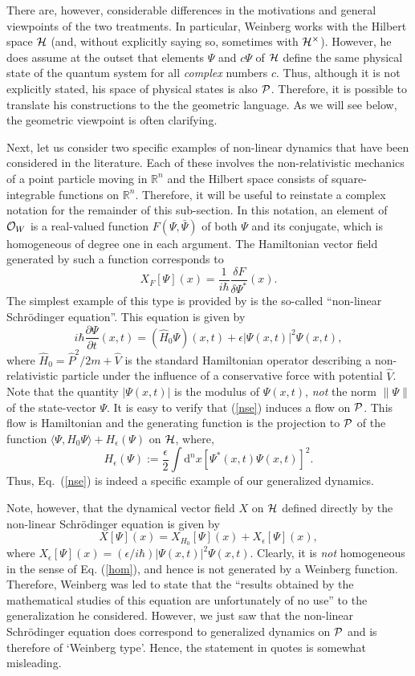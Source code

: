 \documentclass[12pt,aps,eqsecnum,tighten]{revtex4-2}
\def\be{\begin{equation}}
\def\ee{\end{equation}}
\def\<{\langle}
\def\>{\rangle}
\def\d{{\mathrm d}}
\def\i{{i}}
\def\H{{\cal H}}
\def\punctH{{\cal H}^{\times}}
\def\P{{\cal P}}
\newcommand{\hvf}[1]{{X_{#1}}}
\def\R{\mathbb R}
\begin{document}
There are, however, considerable differences in the motivations and
general viewpoints of the two treatments. In particular, Weinberg
works with the Hilbert space $\H$ (and, without explicitly saying so,
sometimes with $\punctH$). However, he does assume at the outset that
elements $\Psi$ and $c\Psi$ of $\H$ define the same physical state of
the quantum system for all {\it complex} numbers $c$. Thus, although
it is not explicitly stated, his space of physical states is also
$\P$.  Therefore, it is possible to translate his constructions to the
the geometric language. As we will see below, the geometric viewpoint
is often clarifying.

Next, let us consider two specific examples of non-linear dynamics
that have been considered in the literature.  Each of these involves
the non-relativistic mechanics of a point particle moving in $\R^n$
and the Hilbert space consists of square-integrable functions on
$\R^n$. Therefore, it will be useful to reinstate a complex notation
for the remainder of this sub-section.  In this notation, an element
of ${\cal O}_W$ is a real-valued function $F(\Psi, \bar{\Psi})$ of
both $\Psi$ and its conjugate, which is homogeneous of degree one in
each argument. The Hamiltonian vector field generated by such a
function corresponds to
%
\be 
\hvf{F}[\Psi](x) = \frac{1}{\i\hbar} \frac{\delta
F}{\delta \Psi^*} ( x ).  
\ee
%
The simplest example of this type is provided by is the so-called
``non-linear Schr\"odinger equation''.  This equation is given by
%
\be \label{nse}
\i\hbar \frac{\partial \Psi}{\partial t}(x,t) = 
(\hat{H}_0 \Psi)(x,t) + \epsilon | \Psi(x,t) |^2 \Psi(x,t),
\ee
%
where $\hat{H}_0 = \hat{P}^2/2m + \hat{V}$ is the standard Hamiltonian
operator describing a non-relativistic particle under the influence of
a conservative force with potential $\hat{V}$.  Note that the quantity
$| \Psi(x,t) | $ is the modulus of $\Psi(x,t)$, {\em not} the norm
$\|\Psi\|$ of the state-vector $\Psi$. It is easy to verify that
(\ref{nse}) induces a flow on $\P$. This flow is Hamiltonian and the
generating function is the projection to $\P$ of the function
$\<\Psi, H_0\Psi\> + H_\epsilon(\Psi)$ on $\H$, where,
%
\be
 H_\epsilon(\Psi) := \frac{\epsilon}{2}\int \d^n \! x
\left[ \Psi^*(x,t) \Psi(x,t) \right]^2.
\ee
%
Thus, Eq.~(\ref{nse}) is indeed a specific example of our generalized
dynamics.

Note, however, that the dynamical vector field $X$ on $\H$ defined
directly by the non-linear Schr\"odinger equation is given by
%
\be X[\Psi](x) = \hvf{H_0}[\Psi](x) + X_\epsilon[\Psi](x), 
\ee 
%
where $X_\epsilon[\Psi](x) = (\epsilon/\i\hbar) |\Psi(x,t)|^2
\Psi(x,t)$. Clearly, it is {\it not} homogeneous in the sense of
Eq. (\ref{hom}), and hence is not generated by a Weinberg function.
Therefore, Weinberg was led to state that the ``results obtained by
the mathematical studies of this equation are unfortunately of no
use'' to the generalization he considered. However, we just saw that
the non-linear Schr\"odinger equation does correspond to generalized
dynamics on $\P$ and is therefore of `Weinberg type'. Hence, the
statement in quotes is somewhat misleading.
\end{document}
